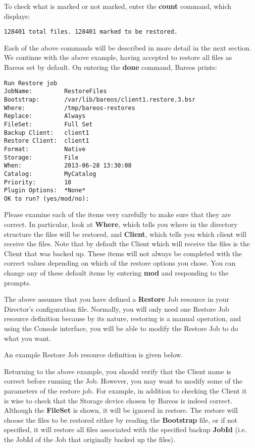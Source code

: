 To check what is marked or not marked, enter the {\bf count} command, which
displays:

\footnotesize
\begin{verbatim}
128401 total files. 128401 marked to be restored.

\end{verbatim}
\normalsize

Each of the above commands will be described in more detail in the next
section. We continue with the above example, having accepted to restore all
files as Bareos set by default. On entering the {\bf done} command, Bareos
prints:

\footnotesize
\begin{verbatim}
Run Restore job
JobName:         RestoreFiles
Bootstrap:       /var/lib/bareos/client1.restore.3.bsr
Where:           /tmp/bareos-restores
Replace:         Always
FileSet:         Full Set
Backup Client:   client1
Restore Client:  client1
Format:          Native
Storage:         File
When:            2013-06-28 13:30:08
Catalog:         MyCatalog
Priority:        10
Plugin Options:  *None*
OK to run? (yes/mod/no):
\end{verbatim}
\normalsize

Please examine each of the items very carefully to make sure that they are
correct.  In particular, look at {\bf Where}, which tells you where in the
directory structure the files will be restored, and {\bf Client}, which
tells you which client will receive the files.  Note that by default the
Client which will receive the files is the Client that was backed up.
These items will not always be completed with the correct values depending
on which of the restore options you chose.  You can change any of these
default items by entering {\bf mod} and responding to the prompts.

The above assumes that you have defined a {\bf Restore} Job resource in your
Director's configuration file. Normally, you will only need one Restore Job
resource definition because by its nature, restoring is a manual operation,
and using the Console interface, you will be able to modify the Restore Job to
do what you want.

An example Restore Job resource definition is given below.

Returning to the above example, you should verify that the Client name is
correct before running the Job. However, you may want to modify some of the
parameters of the restore job. For example, in addition to checking the Client
it is wise to check that the Storage device chosen by Bareos is indeed
correct. Although the {\bf FileSet} is shown, it will be ignored in restore.
The restore will choose the files to be restored either by reading the {\bf
Bootstrap} file, or if not specified, it will restore all files associated
with the specified backup {\bf JobId} (i.e. the JobId of the Job that
originally backed up the files).

